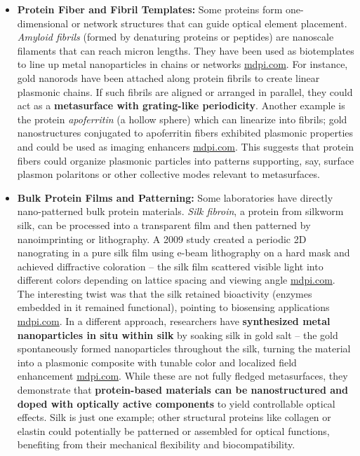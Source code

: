 \documentclass[11pt,a4paper]{article}
\begin{document}
\begin{itemize}
  \item \textbf{Protein Fiber and Fibril Templates:} Some proteins form one-dimensional or network structures that can guide optical element placement. \emph{Amyloid fibrils} (formed by denaturing proteins or peptides) are nanoscale filaments that can reach micron lengths. They have been used as biotemplates to line up metal nanoparticles in chains or networks \href{https://www.mdpi.com/2079-6374/12/11/962#:~:text=for a wide range of,Amyloid fibrils biotemplated}{mdpi.com}. For instance, gold nanorods have been attached along protein fibrils to create linear plasmonic chains. If such fibrils are aligned or arranged in parallel, they could act as a \textbf{metasurface with grating-like periodicity}. Another example is the protein \emph{apoferritin} (a hollow sphere) which can linearize into fibrils; gold nanostructures conjugated to apoferritin fibers exhibited plasmonic properties and could be used as imaging enhancers \href{https://www.mdpi.com/2079-6374/12/11/962#:~:text=match at L1323 for a,Amyloid fibrils biotemplated}{mdpi.com}. This suggests that protein fibers could organize plasmonic particles into patterns supporting, say, surface plasmon polaritons or other collective modes relevant to metasurfaces.
  \item \textbf{Bulk Protein Films and Patterning:} Some laboratories have directly nano-patterned bulk protein materials. \emph{Silk fibroin}, a protein from silkworm silk, can be processed into a transparent film and then patterned by nanoimprinting or lithography. A 2009 study created a periodic 2D nanograting in a pure silk film using e-beam lithography on a hard mask and achieved diffractive coloration -- the silk film scattered visible light into different colors depending on lattice spacing and viewing angle \href{https://www.mdpi.com/2079-6374/12/11/962#:~:text=In 2009%2C Amsden et al,illumination and angle of collection}{mdpi.com}. The interesting twist was that the silk retained bioactivity (enzymes embedded in it remained functional), pointing to biosensing applications \href{https://www.mdpi.com/2079-6374/12/11/962#:~:text=In 2009%2C Amsden et al,illumination and angle of collection}{mdpi.com}. In a different approach, researchers have \textbf{synthesized metal nanoparticles in situ within silk} by soaking silk in gold salt -- the gold spontaneously formed nanoparticles throughout the silk, turning the material into a plasmonic composite with tunable color and localized field enhancement \href{https://www.mdpi.com/2079-6374/12/11/962#:~:text=The research developed by Liu,to these results%2C the different}{mdpi.com}. While these are not fully fledged metasurfaces, they demonstrate that \textbf{protein-based materials can be nanostructured and doped with optically active components} to yield controllable optical effects. Silk is just one example; other structural proteins like collagen or elastin could potentially be patterned or assembled for optical functions, benefiting from their mechanical flexibility and biocompatibility.
\end{itemize}
\end{document}
